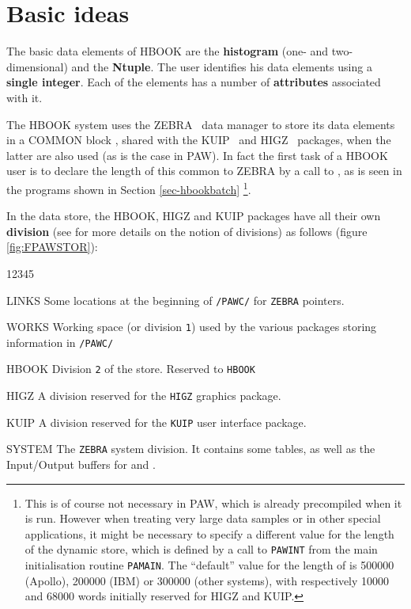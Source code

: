 \section{Basic ideas}

The basic data elements of HBOOK are the {\bf histogram} (one-
and two-dimensional) and the {\bf Ntuple}. The user identifies
his data elements using a {\bf single integer}. Each of the
elements has a number of {\bf attributes} associated with it.

The HBOOK system uses the ZEBRA~\cite{bib-ZEBRA} data manager
to store its data elements in a COMMON block \IPAWCC, shared
with the KUIP~\cite{bib-KUIP} and HIGZ~\cite{bib-HIGZ} packages, 
when the latter are also used (as is the case in PAW). 
In fact the first task of a
HBOOK user is to declare the length of this common to
ZEBRA by a call to , as is seen in the programs shown in
Section \ref{sec-hbookbatch}%
\footnote{This is of course not necessary in PAW, which is already
          precompiled when it is run. However when treating very 
          large data samples or in other special applications, it 
          might be necessary to specify a different value for the 
          length of the dynamic store, which is defined by a call 
          to \texttt{PAWINT}%
          from the main initialisation routine \texttt{PAMAIN}.%
          The ``default'' value for the length of \IPAWCC{} is
          500000 (Apollo), 200000 (IBM) or 300000 (other systems),
          with respectively 10000 and 68000 words initially 
          reserved for HIGZ and KUIP.}.
      
In the \IPAWCC{} data store, the HBOOK,
HIGZ and KUIP packages have all their own
{\bf division} (see \cite{bib-ZEBRA} for
more details on the notion of divisions) as follows 
(figure \ref{fig:FPAWSTOR}):
 
\begin{DLtt}{12345}
\item[LINKS] Some locations at the beginning of
\texttt{/PAWC/}
%
for \texttt{ZEBRA} pointers.
\item[WORKS]  Working space (or division \texttt{1}) used by the
various packages storing information in
\texttt{/PAWC/}
\item[HBOOK] Division \texttt{2} of the store. Reserved to \texttt{HBOOK}
\item[HIGZ] A division reserved for the \texttt{HIGZ}
graphics package.
\item[KUIP] A division reserved for the \texttt{KUIP} user interface package.
\item[SYSTEM] The \texttt{ZEBRA} system division.
It contains some tables, as well as
the Input/Output buffers for  and .
\end{DLtt}

